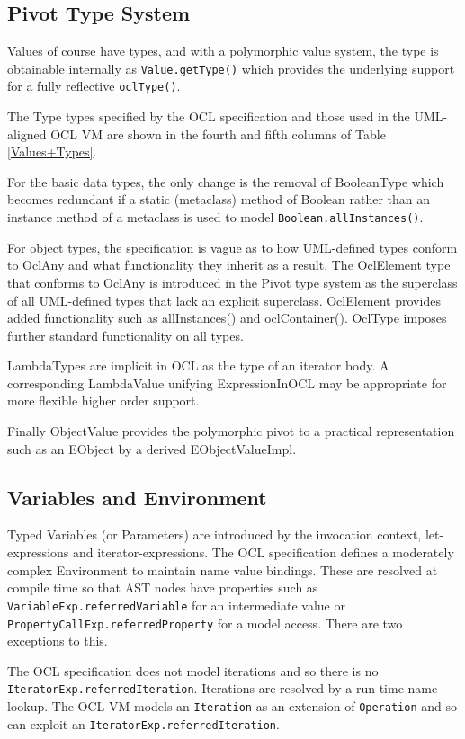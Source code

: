 \documentclass{acm_proc_article-sp}
\begin{document}
\subsection{Pivot Type System}

Values of course have types, and with a polymorphic value system, the type is obtainable internally as \verb|Value.getType()| which provides the underlying support for a fully reflective  \verb|oclType()|.

The Type types specified by the OCL specification and those used in the UML-aligned OCL VM\cite{OCL-UML} are shown in the fourth and fifth columns of Table \ref{Values+Types}.

For the basic data types, the only change is the removal of BooleanType which becomes redundant if a static (metaclass) method of Boolean rather than an instance method of a metaclass is used to model \verb|Boolean.allInstances()|.

For object types, the specification is vague as to how UML-defined types conform to OclAny and what functionality they inherit as a result. The OclElement type that conforms to OclAny is introduced in the Pivot type system as the superclass of all UML-defined types that lack an explicit superclass. OclElement provides added functionality such as allInstances() and oclContainer(). OclType imposes further standard functionality on all types.

LambdaTypes are implicit in OCL as the type of an iterator body\cite{OCL-stdlib}. A corresponding LambdaValue unifying ExpressionInOCL may be appropriate for more flexible higher order support.

Finally ObjectValue provides the polymorphic pivot to a practical representation such as an EObject by a derived EObjectValueImpl. 

\subsection{Variables and Environment}

Typed Variables (or Parameters) are introduced by the invocation context, let-expressions and iterator-expressions. The OCL specification defines a moderately complex Environment to maintain name value bindings. These are resolved at compile time
so that AST nodes have properties such as \verb|VariableExp.referredVariable| for an intermediate value or \verb|PropertyCallExp.referredProperty| for a model access. There are two exceptions to this.

The OCL specification does not model iterations and so there is no  \verb|IteratorExp.referredIteration|. Iterations are resolved by a run-time name lookup. The OCL VM models an \verb|Iteration| as an extension of \verb|Operation| and so can exploit an \verb|IteratorExp.referredIteration|\cite{OCL-UML}.
\end{document}
